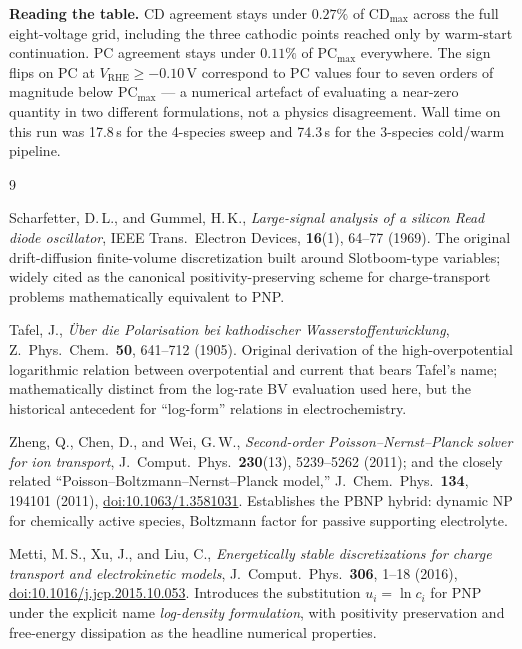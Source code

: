 \documentclass[11pt]{article}
\newcommand{\VRHE}{V_{\mathrm{RHE}}}
\begin{document}
\noindent\textbf{Reading the table.} CD agreement stays under $0.27\%$ of
$\mathrm{CD}_{\max}$ across the full eight-voltage grid, including the
three cathodic points reached only by warm-start continuation. PC
agreement stays under $0.11\%$ of $\mathrm{PC}_{\max}$ everywhere. The
sign flips on PC at $\VRHE \ge -0.10$\,V correspond to PC values four to
seven orders of magnitude below $\mathrm{PC}_{\max}$ --- a numerical
artefact of evaluating a near-zero quantity in two different formulations,
not a physics disagreement. Wall time on this run was 17.8\,s for the
4-species sweep and 74.3\,s for the 3-species cold/warm pipeline.

\begin{thebibliography}{9}

Scharfetter, D.\,L., and Gummel, H.\,K.,
\emph{Large-signal analysis of a silicon Read diode oscillator},
IEEE Trans.\ Electron Devices, \textbf{16}(1), 64--77 (1969).
The original drift-diffusion finite-volume discretization built around
Slotboom-type variables; widely cited as the canonical positivity-preserving
scheme for charge-transport problems mathematically equivalent to PNP.

Tafel, J.,
\emph{\"Uber die Polarisation bei kathodischer Wasserstoffentwicklung},
Z.\ Phys.\ Chem.\ \textbf{50}, 641--712 (1905).
Original derivation of the high-overpotential logarithmic relation between
overpotential and current that bears Tafel's name; mathematically distinct
from the log-rate BV evaluation used here, but the historical antecedent for
``log-form'' relations in electrochemistry.

Zheng, Q., Chen, D., and Wei, G.\,W.,
\emph{Second-order Poisson--Nernst--Planck solver for ion transport},
J.\ Comput.\ Phys.\ \textbf{230}(13), 5239--5262 (2011);
and the closely related ``Poisson--Boltzmann--Nernst--Planck model,''
J.\ Chem.\ Phys.\ \textbf{134}, 194101 (2011),
\href{https://doi.org/10.1063/1.3581031}{doi:10.1063/1.3581031}.
Establishes the PBNP hybrid: dynamic NP for chemically active species,
Boltzmann factor for passive supporting electrolyte.

Metti, M.\,S., Xu, J., and Liu, C.,
\emph{Energetically stable discretizations for charge transport and
electrokinetic models},
J.\ Comput.\ Phys.\ \textbf{306}, 1--18 (2016),
\href{https://doi.org/10.1016/j.jcp.2015.10.053}{doi:10.1016/j.jcp.2015.10.053}.
Introduces the substitution $u_i = \ln c_i$ for PNP under the explicit name
\emph{log-density formulation}, with positivity preservation and
free-energy dissipation as the headline numerical properties.


\end{thebibliography}
\end{document}
